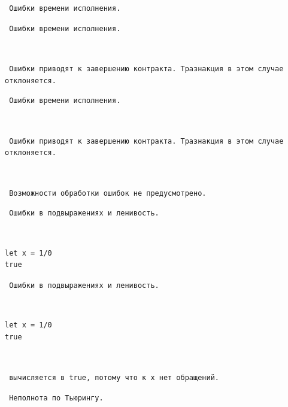 \documentclass[11pt,handout,pdf,hyperref={unicode}]{beamer}
\begin{document}
\begin{frame}[fragile]

\texttt{ Ошибки времени исполнения. }

\end{frame}

\begin{frame}[fragile]

\texttt{ Ошибки времени исполнения. }

\texttt{ }

\texttt{ Ошибки приводят к завершению контракта. Тразнакция в этом случае отклоняется. }

\end{frame}

\begin{frame}[fragile]

\texttt{ Ошибки времени исполнения. }

\texttt{ }

\texttt{ Ошибки приводят к завершению контракта. Тразнакция в этом случае отклоняется. }

\texttt{ }

\texttt{ Возможности обработки ошибок не предусмотрено. }

\end{frame}

\begin{frame}[fragile]

\texttt{ Ошибки в подвыражениях и ленивость. }

\texttt{ }

\begin{verbatim}
let x = 1/0
true
\end{verbatim}

\end{frame}

\begin{frame}[fragile]

\texttt{ Ошибки в подвыражениях и ленивость. }

\texttt{ }

\begin{verbatim}
let x = 1/0
true
\end{verbatim}

\texttt{ }

\texttt{ вычисляется в true, потому что к x нет обращений. }

\end{frame}

\begin{frame}[fragile]

\texttt{ Неполнота по Тьюрингу. }

\end{frame}
\end{document}
